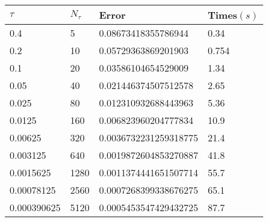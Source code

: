\begin{tabular}{llll} 
\hline 
$\tau$  & $N_\tau$  &  Error & Times$(s)$  \\ 
\hline \hline 
0.4  & 5 & \num{0.08673418355786944} & 0.34 \\ 
0.2  & 10 & \num{0.05729363869201903} & 0.754 \\ 
0.1  & 20 & \num{0.03586104654529009} & 1.34 \\ 
0.05  & 40 & \num{0.021446374507512578} & 2.65 \\ 
0.025  & 80 & \num{0.012310932688443963} & 5.36 \\ 
0.0125  & 160 & \num{0.006823960204777834} & 10.9 \\ 
0.00625  & 320 & \num{0.0036732231259318775} & 21.4 \\ 
0.003125  & 640 & \num{0.0019872604853270887} & 41.8 \\ 
0.0015625  & 1280 & \num{0.0011374441651507714} & 55.7 \\ 
0.00078125  & 2560 & \num{0.0007268399338676275} & 65.1 \\ 
0.000390625  & 5120 & \num{0.0005453547429432725} & 87.7 \\ 
\hline 
\end{tabular} 
